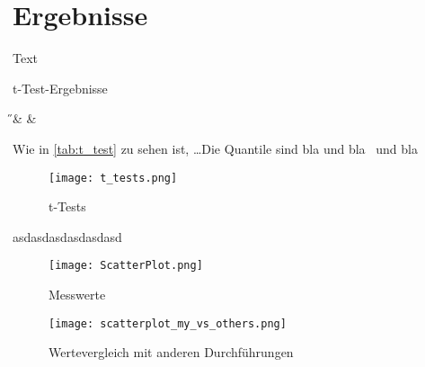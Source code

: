\section{Ergebnisse} %
    \label{sec:ergebnisse}
    Text

    \begin{table}[h]
        \centering
        \caption{t-Test-Ergebnisse}
        \label{tab:t_test}
        {\H & \pH & \NaCl}
    \end{table}
    Wie in \autoref{tab:t_test} zu sehen ist, \dots Die Quantile sind bla und bla\ \cite[vgl.][]{web:t-values} und bla\ \cite[vgl.][]{web:Gartenratgeber}\\

    \begin{figure}[ht]
        \texttt{[image: t\_tests.png]}
        \caption{t-Tests}
        \label{fig:t_tests}
    \end{figure}
    asdasdasdasdasdasd\newpage

    \begin{figure}[ht]
        \texttt{[image: ScatterPlot.png]}
        \caption{Messwerte}
        \label{fig:scat_plot}
    \end{figure}\newpage

    \begin{figure}[ht]
        \texttt{[image: scatterplot\_my\_vs\_others.png]}
        \caption{Wertevergleich mit anderen Durchführungen}
        \label{fig:scat_plot_cmp}
    \end{figure}
